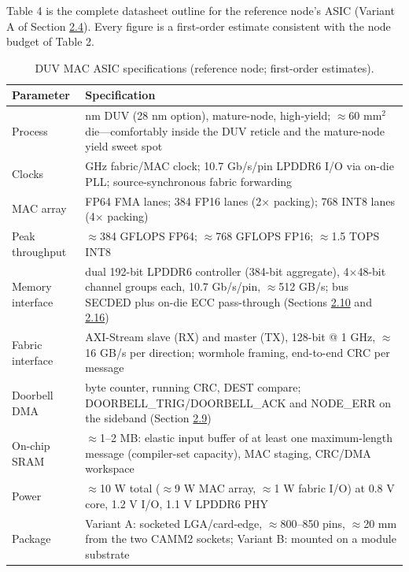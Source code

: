 \documentclass[10pt,twocolumn]{article}
\begin{document}
Table 4 is the complete datasheet outline for the reference node's ASIC (Variant A of Section \hyperref[sec:2.4]{2.4}). Every figure is a first-order estimate consistent with the node budget of Table 2.

\begin{table}[t]
\centering
\footnotesize
\caption{DUV MAC ASIC specifications (reference node; first-order estimates).}\label{tab:4}
\begin{tabularx}{\columnwidth}{>{\hsize=0.4000\hsize}X>{\hsize=1.6000\hsize}X}
\toprule
Parameter & Specification \\
\midrule
Process & 14 nm DUV (28 nm option), mature-node, high-yield; $\approx$60 mm$^2$ die---comfortably inside the DUV reticle and the mature-node yield sweet spot \\
Clocks & 1 GHz fabric/MAC clock; 10.7 Gb/s/pin LPDDR6 I/O via on-die PLL; source-synchronous fabric forwarding \\
MAC array & 192 FP64 FMA lanes; 384 FP16 lanes (2$\times$ packing); 768 INT8 lanes (4$\times$ packing) \\
Peak throughput & $\approx$384 GFLOPS FP64; $\approx$768 GFLOPS FP16; $\approx$1.5 TOPS INT8 \\
Memory interface & dual 192-bit LPDDR6 controller (384-bit aggregate), 4$\times$48-bit channel groups each, 10.7 Gb/s/pin, $\approx$512 GB/s; bus SECDED plus on-die ECC pass-through (Sections \hyperref[sec:2.10]{2.10} and \hyperref[sec:2.16]{2.16}) \\
Fabric interface & AXI-Stream slave (RX) and master (TX), 128-bit @ 1 GHz, $\approx$16 GB/s per direction; wormhole framing, end-to-end CRC per message \\
Doorbell DMA & byte counter, running CRC, DEST compare; DOORBELL\_TRIG/DOORBELL\_ACK and NODE\_ERR on the sideband (Section \hyperref[sec:2.9]{2.9}) \\
On-chip SRAM & $\approx$1--2 MB: elastic input buffer of at least one maximum-length message (compiler-set capacity), MAC staging, CRC/DMA workspace \\
Power & $\approx$10 W total ($\approx$9 W MAC array, $\approx$1 W fabric I/O) at 0.8 V core, 1.2 V I/O, 1.1 V LPDDR6 PHY \\
Package & Variant A: socketed LGA/card-edge, $\approx$800--850 pins, $\approx$20 mm from the two CAMM2 sockets; Variant B: mounted on a module substrate \\
\bottomrule
\end{tabularx}
\end{table}
\end{document}
